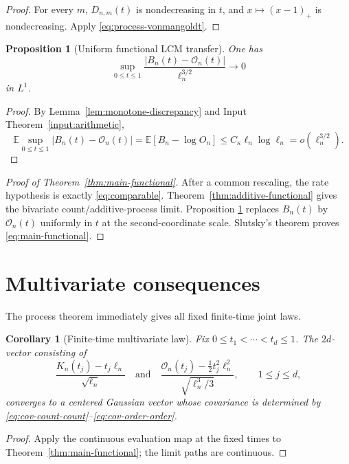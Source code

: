 \documentclass[11pt]{article}
\newtheorem{proposition}[theorem]{Proposition}
\newtheorem{corollary}[theorem]{Corollary}
\theoremstyle{definition}
\theoremstyle{remark}
\newcommand{\Ee}{\mathbb E}
\newcommand{\cO}{\mathcal O}
\begin{document}
\begin{proof}
For every $m$, $D_{n,m}(t)$ is nondecreasing in $t$, and
$x\mapsto(x-1)_+$ is nondecreasing.  Apply
\eqref{eq:process-vonmangoldt}.
\end{proof}

\begin{proposition}[Uniform functional LCM transfer]
\label{prop:functional-LCM-transfer}
One has
\begin{equation}\label{eq:functional-LCM-transfer}
 \sup_{0\le t\le1}
 \frac{|B_n(t)-\cO_n(t)|}{\ell_n^{3/2}}
 \longrightarrow0
\end{equation}
in $L^1$.
\end{proposition}

\begin{proof}
By Lemma~\ref{lem:monotone-discrepancy} and
Input Theorem~\ref{input:arithmetic},
\[
 \Ee\sup_{0\le t\le1}|B_n(t)-\cO_n(t)|
 =\Ee[B_n-\log O_n]
 \le C_\kappa\ell_n\log\ell_n
 =o(\ell_n^{3/2}).
\]
\end{proof}

\begin{proof}[Proof of Theorem~\ref{thm:main-functional}]
After a common rescaling, the rate hypothesis is exactly
\eqref{eq:comparable}.  Theorem~\ref{thm:additive-functional} gives the
bivariate count/additive-process limit.  Proposition
\ref{prop:functional-LCM-transfer} replaces $B_n(t)$ by $\cO_n(t)$ uniformly
in $t$ at the second-coordinate scale.  Slutsky's theorem proves
\eqref{eq:main-functional}.
\end{proof}

\section{Multivariate consequences}

The process theorem immediately gives all fixed finite-time joint laws.

\begin{corollary}[Finite-time multivariate law]
\label{cor:finite-time}
Fix $0\le t_1<\cdots<t_d\le1$.  The $2d$-vector consisting of
\[
 \frac{K_n(t_j)-t_j\ell_n}{\sqrt{\ell_n}}
 \quad\text{and}\quad
 \frac{\cO_n(t_j)-\frac12t_j^2\ell_n^2}
      {\sqrt{\ell_n^3/3}},
 \qquad 1\le j\le d,
\]
converges to a centered Gaussian vector whose covariance is determined by
\eqref{eq:cov-count-count}--\eqref{eq:cov-order-order}.
\end{corollary}

\begin{proof}
Apply the continuous evaluation map at the fixed times to
Theorem~\ref{thm:main-functional}; the limit paths are continuous.
\end{proof}
\end{document}
